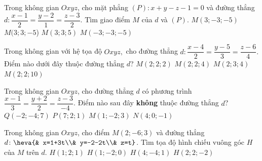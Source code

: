 	\begin{ex}%
	Trong không gian $Oxyz$, cho mặt phẳng $(P): x+y-z-1=0$ và đường thẳng $d:\dfrac{x-1}{2}=\dfrac{y-2}{1}=\dfrac{z-3}{2}$. Tìm giao điểm $M$ của $d$ và $(P)$.
	\choice 
	{$M(3;-3;-5)$}
	{$M(3;3;-5$)}
	{\True $M(3;3;5)$}
	{$M(-3;-3;-5)$} 
	\end{ex} 
	\begin{ex}%
	Trong không gian với hệ tọa độ $Oxyz,$ cho đường thẳng $d:\dfrac{x-4}{2}=\dfrac{y-5}{3}=\dfrac{z-6}{4}.$ Điểm nào dưới đây thuộc đường thẳng $d$?
	\choice
	{\True $M\left(2;2;2\right)$}
	{$M\left(2;2;4\right)$}
	{$M\left(2;3;4\right)$}
	{$M\left(2;2;10\right)$}
	\end{ex}
	\begin{ex}%
	Trong không gian $Oxyz$, cho đường thẳng $d$ có phương trình $\dfrac{x-1}{3}=\dfrac{y+2}{2}=\dfrac{z-3}{-4}$. Điểm nào sau đây \textbf{không} thuộc đường thẳng $d$?
	\choice
	{$Q\left(-2;-4;7\right)$}
	{\True $P\left(7;2;1\right)$}
	{$M\left(1;-2;3\right)$}
	{$N\left(4;0;-1\right)$}
	\end{ex}
	\begin{ex}%
	Trong không gian $Oxyz$, cho điểm $M(2;-6;3)$ và đường thẳng $d\colon\heva{& x=1+3t\\& y=-2-2t\\& z=t}$. Tìm tọa độ hình chiếu vuông góc $H$ của $M$ trên $d$.
	\choice
	{$H(1;2;1)$}
	{$H(1;-2;0)$}
	{\True $H(4;-4;1)$}
	{$H(2;2;-2)$}
	\end{ex} 
